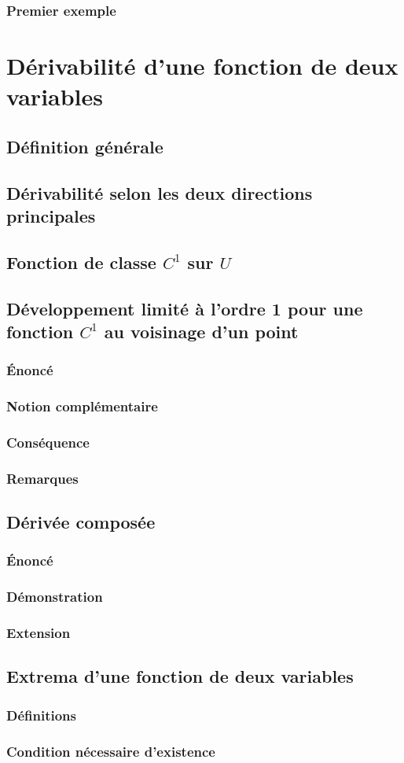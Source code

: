 \documentclass[12pt,a4paper,french]{book}
\begin{document}
			\subsubsection{Premier exemple}
	\section{Dérivabilité d'une fonction de deux variables}
		\subsection{Définition générale}
		\subsection{Dérivabilité selon les deux directions principales}
		\subsection{Fonction de classe $C^{1}$ sur $U$}
		\subsection{Développement limité à l'ordre 1 pour une fonction $C^{1}$ au voisinage d'un point}
			\subsubsection{Énoncé}
			\subsubsection{Notion complémentaire}
			\subsubsection{Conséquence}
			\subsubsection{Remarques}
		\subsection{Dérivée composée}
			\subsubsection{Énoncé}
			\subsubsection{Démonstration}
			\subsubsection{Extension}
		\subsection{Extrema d'une fonction de deux variables}
			\subsubsection{Définitions}
			\subsubsection{Condition nécessaire d'existence}



	
	
	
	
	
	
	
	
\end{document}
